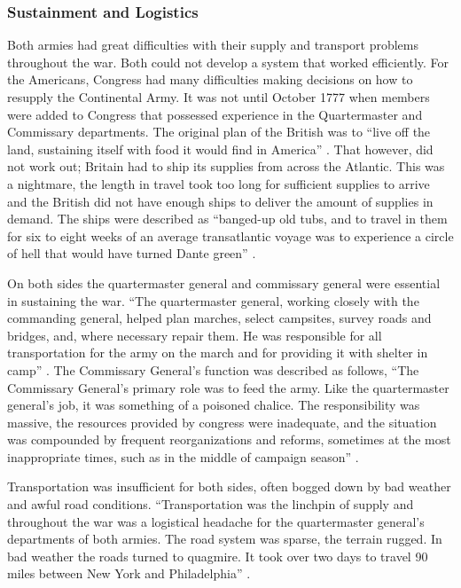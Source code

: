 \subsubsection{Sustainment and Logistics}


Both armies had great difficulties with their supply and transport problems
throughout the war.  Both could not develop a system that worked efficiently.
For the Americans, Congress had many difficulties making decisions on how to
resupply the Continental Army.  It was not until October 1777 when members were
added to Congress that possessed experience in the Quartermaster and Commissary
departments.  The original plan of the British was to “live off the land,
sustaining itself with food it would find in America”
\cite[p.115]{stephenson_patriot_2007}.  That
however, did not work out; Britain had to ship its supplies from across the
Atlantic.  This was a nightmare, the length in travel took too long for
sufficient supplies to arrive and the British did not have enough ships to
deliver the amount of supplies in demand.  The ships were described as
“banged-up old tubs, and to travel in them for six to eight weeks of an average
transatlantic voyage was to experience a circle of hell that would have turned
Dante green” \cite[p.118]{stephenson_patriot_2007}.     

On both sides the quartermaster general and commissary general were essential in
sustaining the war.  “The quartermaster general, working closely with the
commanding general, helped plan marches, select campsites, survey roads and
bridges, and, where necessary repair them.  He was responsible for all
transportation for the army on the march and for providing it with shelter in
camp” \cite[p.103]{stephenson_patriot_2007}.  The Commissary General’s function was described as
follows,  “The Commissary General’s primary role was to feed the army.  Like the
quartermaster general’s job, it was something of a poisoned chalice.  The
responsibility was massive, the resources provided by congress were inadequate,
and the situation was compounded by frequent reorganizations and reforms,
sometimes at the most inappropriate times, such as in the middle of campaign
season” \cite[p.104]{stephenson_patriot_2007}.  

Transportation was insufficient for both sides, often bogged down by bad weather
and awful road conditions.  “Transportation was the linchpin of supply and
throughout the war was a logistical headache for the quartermaster general’s
departments of both armies.  The road system was sparse, the terrain rugged.  In
bad weather the roads turned to quagmire.  It took over two days to travel 90
miles between New York and Philadelphia” \cite[105]{stephenson_patriot_2007}.

